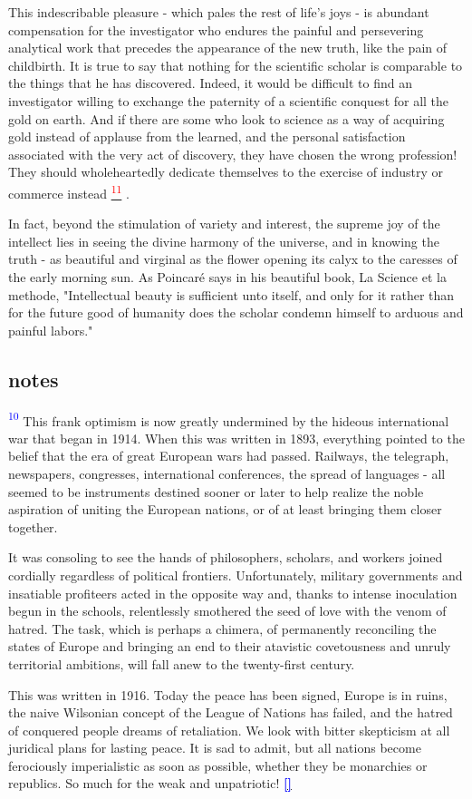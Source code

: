 \documentclass{article}
\newcommand{\noteref}[1]{%
 \hypertarget{ref:#1}{}%
 \hyperlink{note:#1}{\textsuperscript{\textcolor{red}{#1}}}%
}
\newcommand{\notetext}[2]{
 \par\noindent
 \hypertarget{note:#1}{\textsuperscript{\textcolor{blue}{#1}}} #2
 \hyperlink{ref:#1}{\textcolor{blue}{\textbf{[\textuparrow]}}}
 \par\vspace{1em}
}
\begin{document}
This indescribable pleasure - which pales the rest of life’s joys - is abundant compensation for the investigator who endures the painful and persevering analytical work that precedes the appearance of the new truth, like the pain of childbirth. It is true to say that nothing for the scientific scholar is comparable to the things that he has discovered. Indeed, it would be difficult to find an investigator willing to exchange the paternity of a scientific conquest for all the gold on earth. And if there are some who look to science as a way of acquiring gold instead of applause from the learned, and the personal satisfaction associated with the very act of discovery, they have chosen the wrong profession! They should wholeheartedly dedicate themselves to the exercise of industry or commerce instead\noteref{11}.

In fact, beyond the stimulation of variety and interest, the supreme joy of the intellect lies in seeing the divine harmony of the universe, and in knowing the truth - as beautiful and virginal as the flower opening its calyx to the caresses of the early morning sun. As Poincaré says in his beautiful book, La Science et la methode, "Intellectual beauty is sufficient unto itself, and only for it rather than for the future good of humanity does the scholar condemn himself to arduous and painful labors."

\subsection*{notes}

\notetext{10}{ This frank optimism is now greatly undermined by the hideous international war that began in 1914. When this was written in 1893, everything pointed to the belief that the era of great European wars had passed. Railways, the telegraph, newspapers, congresses, international conferences, the spread of languages - all seemed to be instruments destined sooner or later to help realize the noble aspiration of uniting the European nations, or of at least bringing them closer together.

It was consoling to see the hands of philosophers, scholars, and workers joined cordially regardless of political frontiers. Unfortunately, military governments and insatiable profiteers acted in the opposite way and, thanks to intense inoculation begun in the schools, relentlessly smothered the seed of love with the venom of hatred. The task, which is perhaps a chimera, of permanently reconciling the states of Europe and bringing an end to their atavistic covetousness and unruly territorial ambitions, will fall anew to the twenty-first century.

This was written in 1916. Today the peace has been signed, Europe is in ruins, the naive Wilsonian concept of the League of Nations has failed, and the hatred of conquered people dreams of retaliation. We look with bitter skepticism at all juridical plans for lasting peace. It is sad to admit, but all nations become ferociously imperialistic as soon as possible, whether they be monarchies or republics. So much for the weak and unpatriotic!}
\end{document}
